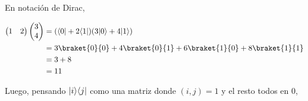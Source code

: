 \documentclass[osajnl,preprint,showpacs,superscriptaddress,10pt]{revtex4-1} %
\DeclarePairedDelimiter\bra{\langle}{\rvert}
\DeclarePairedDelimiter\ket{\lvert}{\rangle}
\begin{document}
\begin{itemize}
    En notación de Dirac,
    \begin{fleqn}[\parindent]
    \begin{equation}
    \begin{split}
        \begin{pmatrix}1 & 2\end{pmatrix}\begin{pmatrix}3 \\ 4\end{pmatrix}
            &= (\bra{0} + 2\bra{1})(3\ket{0} + 4\ket{1}) \\
            &= 3\braket{0}{0} + 4\braket{0}{1} + 6\braket{1}{0} + 8\braket{1}{1} \\
            &= 3 + 8 \\
            &= 11
    \end{split}
    \end{equation}
    \end{fleqn}
    
\end{itemize}

Luego, pensando $\ket{i}\bra{j}$ como una matriz donde $(i, j) = 1$ y el resto todos en 0,
\end{document}
